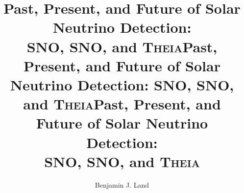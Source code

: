 \documentclass[12pt,letterpaper,oldfontcommands]{ucbthesis}
\begin{document}
\newcommand{\Li}{$^{8}$Li }
\newcommand{\N}{$^{16}$N }
\newcommand{\B}{$^{8}$B }
\newcommand{\snop}{SNO\raisebox{0.1ex}{\texttt{+}}}
\newcommand{\labppo}{LAB\raisebox{0.1ex}{\texttt{+}}PPO}

\title{Past, Present, and Future of Solar Neutrino Detection:\\SNO, {\snop}, and \textsc{Theia}}
\author{Benjamin J. Land}
\maketitle
\title{Past, Present, and Future of Solar Neutrino Detection: SNO, {\snop}, and \textsc{Theia}}
\approvalpage
\title{Past, Present, and Future of Solar Neutrino Detection:\\SNO, {\snop}, and \textsc{Theia}}
\copyrightpage


\end{document}
